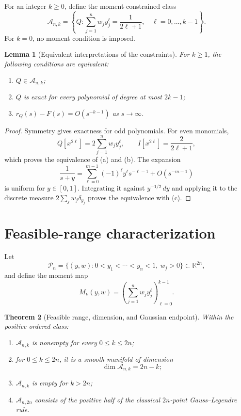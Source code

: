 \documentclass[preprint,12pt]{elsarticle}
\newtheorem{theorem}{Theorem}
\newtheorem{lemma}[theorem]{Lemma}
\theoremstyle{remark}
\begin{document}
For an integer \(k\geq0\), define the moment-constrained class
\[
\mathcal A_{n,k}
=
\left\{
Q:
\sum_{j=1}^{n}w_jy_j^\ell=\frac{1}{2\ell+1},
\quad \ell=0,\ldots,k-1
\right\}.
\]
For \(k=0\), no moment condition is imposed.

\begin{lemma}[Equivalent interpretations of the constraints]
For \(k\geq1\), the following conditions are equivalent:
\begin{enumerate}[label=(\alph*)]
\item \(Q\in\mathcal A_{n,k}\);
\item \(Q\) is exact for every polynomial of degree at most \(2k-1\);
\item \(r_Q(s)-F(s)=O(s^{-k-1})\) as \(s\to\infty\).
\end{enumerate}
\end{lemma}

\begin{proof}
Symmetry gives exactness for odd polynomials. For even monomials,
\[
Q[x^{2\ell}]=2\sum_{j=1}^{n}w_jy_j^\ell,
\qquad
I[x^{2\ell}]=\frac{2}{2\ell+1},
\]
which proves the equivalence of (a) and (b). The expansion
\[
\frac{1}{s+y}
=
\sum_{\ell=0}^{m-1}(-1)^\ell y^\ell s^{-\ell-1}
+O(s^{-m-1})
\]
is uniform for \(y\in[0,1]\). Integrating it against
\(y^{-1/2}\,dy\) and applying it to the discrete measure
\(2\sum_jw_j\delta_{y_j}\) proves the equivalence with (c).
\end{proof}

\section{Feasible-range characterization}

Let
\[
\mathcal P_n
=
\{(y,w):
0<y_1<\cdots<y_n<1,\ w_j>0\}
\subset\mathbb R^{2n},
\]
and define the moment map
\[
M_k(y,w)
=
\left(
\sum_{j=1}^{n}w_jy_j^\ell
\right)_{\ell=0}^{k-1}.
\]

\begin{theorem}[Feasible range, dimension, and Gaussian endpoint]
Within the positive ordered class:
\begin{enumerate}[label=(\roman*)]
\item \(\mathcal A_{n,k}\) is nonempty for every \(0\leq k\leq2n\);
\item for \(0\leq k\leq2n\), it is a smooth manifold of dimension
\[
\dim\mathcal A_{n,k}=2n-k;
\]
\item \(\mathcal A_{n,k}\) is empty for \(k>2n\);
\item \(\mathcal A_{n,2n}\) consists of the positive half of the
classical \(2n\)-point Gauss--Legendre rule.
\end{enumerate}
\end{theorem}
\end{document}
